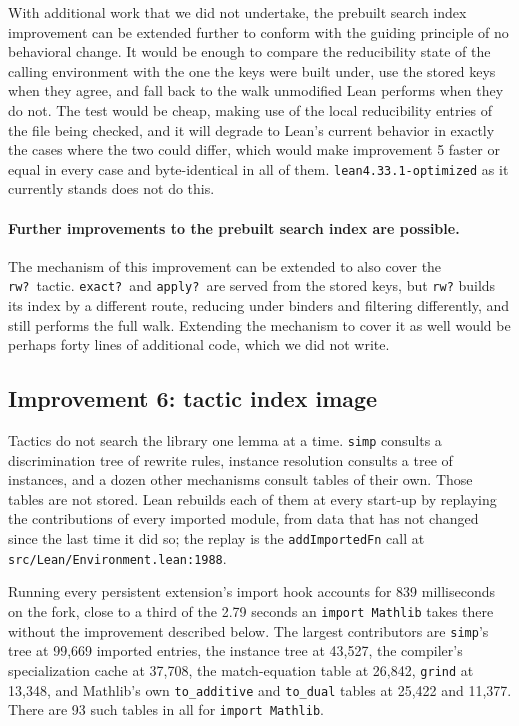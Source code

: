 \documentclass{article}
\newcommand{\Lean}{Lean\xspace}      %
\newcommand{\mathlib}{Mathlib\xspace}
\newcommand{\altlean}{\texttt{lean4.33.1-\allowbreak optimized}\xspace}
\begin{document}
With additional work that we did not undertake, the prebuilt search index improvement can be extended further to conform with the guiding principle of no behavioral change. It would be enough to compare the reducibility state of the calling environment with the one the keys were built under, use the stored keys when they agree, and fall back to the walk unmodified \Lean performs when they do not. The test would be cheap, making use of the local reducibility entries of the file being checked, and it will degrade to \Lean's current behavior in exactly the cases where the two could differ, which would make improvement 5 faster or equal in every case and byte-identical in all of them. \altlean as it currently stands does not do this.

\paragraph{Further improvements to the prebuilt search index are possible.}
The mechanism of this improvement can be extended to also cover the \texttt{rw?}\ tactic.
\texttt{exact?}\ and \texttt{apply?}\ are served from the stored keys, but \texttt{rw?} builds its index by a different route, reducing under binders and filtering differently, and still performs the full walk. Extending the mechanism to cover it as well would be perhaps forty lines of additional code, which we did not write.

\subsection{Improvement 6: tactic index image}
\label{sec:tn-6}

Tactics do not search the library one lemma at a time. \texttt{simp} consults a discrimination tree of rewrite rules, instance resolution consults a tree of instances, and a dozen other mechanisms consult tables of their own. Those tables are not stored. \Lean rebuilds each of them at every start-up by replaying the contributions of every imported module, from data that has not changed since the last time it did so; the replay is the \texttt{addImportedFn} call at \texttt{src/Lean/Environment.lean:1988}.

Running every persistent extension's import hook accounts for 839 milliseconds on the fork, close to a third of the 2.79 seconds an \texttt{import Mathlib} takes there without the improvement described below. The largest contributors are \texttt{simp}'s tree at 99{,}669 imported entries, the instance tree at 43{,}527, the compiler's specialization cache at 37{,}708, the match-equation table at 26{,}842, \texttt{grind} at 13{,}348, and \mathlib's own \texttt{to\_additive} and \texttt{to\_dual} tables at 25{,}422 and 11{,}377. There are 93 such tables in all for \texttt{import Mathlib}.
\end{document}

